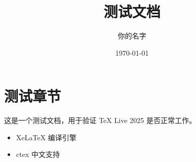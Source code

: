 \documentclass{article}
\begin{document}
\title{测试文档}
\author{你的名字}
\date{\today}
\maketitle

\section{测试章节}
这是一个测试文档，用于验证 TeX Live 2025 是否正常工作。

\begin{itemize}
    \item XeLaTeX 编译引擎
    \item ctex 中文支持
\end{itemize}
\end{document}
